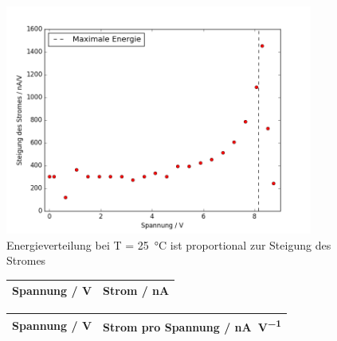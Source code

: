 \begin{figure}
	\centering
	\includegraphics[width=0.9\textwidth]{build/Energieverteilung_25.png}
	\caption{Energieverteilung bei  T = \SI{25}{\celsius} ist proportional zur Steigung des Stromes}
	\label{fig:energieverteilung_25}
\end{figure}

\begin{figure}
	\centering
	\begin{tabular}{cc}
		Spannung / \si{\volt} & Strom /  \si{\nano\ampere}   \\
		\hline
		
	\end{tabular}
	\label{tab:stromverlauf_140}
\end{figure}

\begin{figure}
	\centering
	\begin{tabular}{cc}
		Spannung / \si{\volt} & Strom pro Spannung / \si{\nano\ampere\per\volt}   \\
		\hline
		
	\end{tabular}
	\label{tab:energieverteilung_140}
\end{figure}


